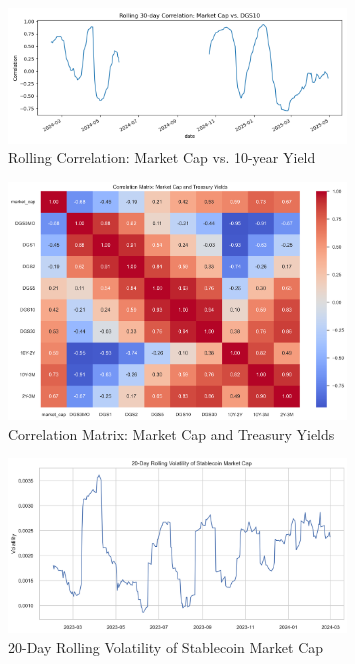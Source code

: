 \documentclass[12pt,a4paper]{article}
\begin{document}
\begin{figure}[H]
    \centering
    \includegraphics[width=0.8\textwidth]{figures/rolling_corr_marketcap_DGS10.png}
    \caption{Rolling Correlation: Market Cap vs. 10-year Yield}
    \label{fig:rolling_corr}
\end{figure}

\begin{figure}[H]
    \centering
    \includegraphics[width=0.8\textwidth]{figures/correlation_heatmap.png}
    \caption{Correlation Matrix: Market Cap and Treasury Yields}
    \label{fig:correlation_heatmap}
\end{figure}

\begin{figure}[H]
    \centering
    \includegraphics[width=0.8\textwidth]{figures/market_cap_volatility.png}
    \caption{20-Day Rolling Volatility of Stablecoin Market Cap}
    \label{fig:volatility}
\end{figure}
\end{document}
